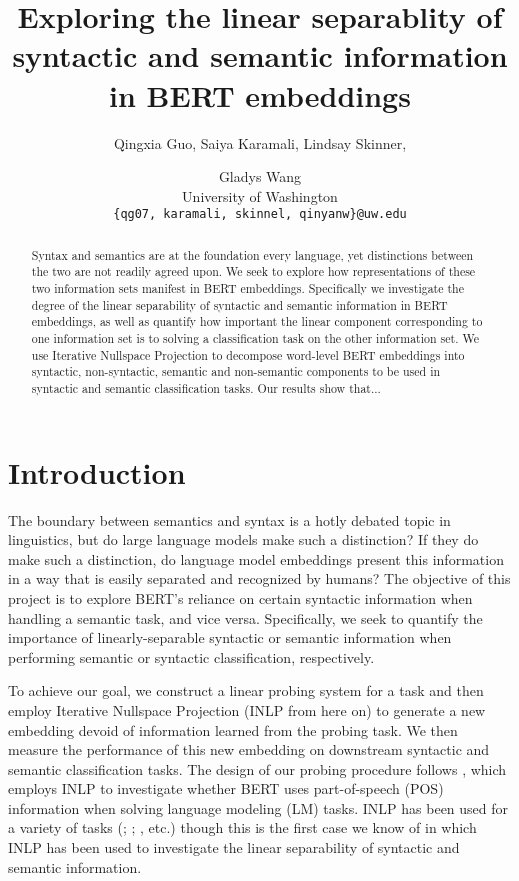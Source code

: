 \documentclass[11pt,a4paper]{article}
\title{Exploring the linear separablity of syntactic and semantic information in BERT embeddings }
\author{Qingxia Guo, Saiya Karamali, Lindsay Skinner, \and Gladys Wang
 \\ University of Washington \\ 
\texttt{\{qg07, karamali, skinnel, qinyanw\}@uw.edu}\\ 
}
\date{}
\begin{document}
\maketitle

\begin{abstract}
Syntax and semantics are at the foundation every language, yet distinctions between the two are not readily agreed upon. We seek to explore how representations of these two information sets manifest in BERT embeddings. Specifically we investigate the degree of the linear separability of syntactic and semantic information in BERT embeddings, as well as quantify how important the linear component corresponding to one information set is to solving a classification task on the other information set. We use Iterative Nullspace Projection to decompose word-level BERT embeddings into syntactic, non-syntactic, semantic and non-semantic components to be used in syntactic and semantic classification tasks. Our results show that...
\end{abstract}



\section{Introduction}
\label{sec:introduction}


The boundary between semantics and syntax is a hotly debated topic in linguistics, but do large language models make such a distinction? If they do make such a distinction, do language model embeddings present this information in a way that is easily separated and recognized by humans? The objective of this project is to explore BERT\rq s \citep{bert} reliance on certain syntactic information when handling a semantic task, and vice versa. Specifically, we seek to quantify the importance of linearly-separable syntactic or semantic information when performing semantic or syntactic classification, respectively. 

To achieve our goal, we construct a linear probing system for a task and then employ Iterative Nullspace Projection (INLP from here on) \citep{inlp} to generate a new embedding devoid of information learned from the probing task. We then measure the performance of this new embedding on downstream syntactic and semantic classification tasks. The design of our probing procedure follows \citealp{amnesia}, which employs INLP to investigate whether BERT uses part-of-speech (POS) information when solving language modeling (LM) tasks. INLP has been used for a variety of tasks (\citealp{inlp}; \citealp{amnesia}; \citealp{mbertGreek}, etc.) though this is the first case we know of in which INLP has been used to investigate the linear separability of syntactic and semantic information. 
\end{document}
